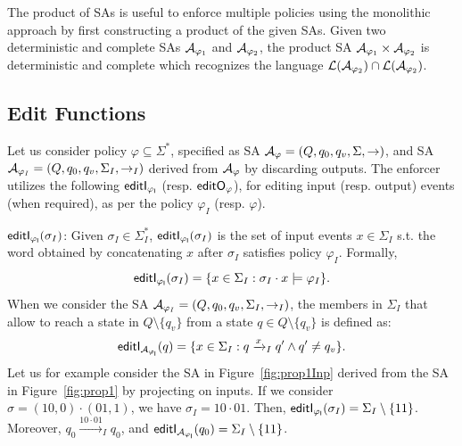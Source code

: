The product of SAs is useful to enforce multiple policies using the monolithic approach by first constructing a product of the given SAs. Given two deterministic and complete SAs ${\cal A}_{\varphi_1}$ and ${\cal A}_{\varphi_2}$, the product SA ${\cal A}_{\varphi_1} \times {\cal A}_{\varphi_2}$ is deterministic and complete which recognizes the language 
${\cal L}({\cal A}_{\varphi_2}) \cap {\cal L}({\cal A}_{\varphi_2})$.
\subsection{Edit Functions}
\label{sec:prelim:re}
Let us consider policy $\varphi\subseteq\Sigma^*$, specified as SA ${\cal A}_{\varphi}=(Q, q_0, q_v, \Sigma, \rightarrow)$, and SA ${\cal A}_{\varphi_I}=(Q, q_0, q_v, \Sigma_I, \rightarrow_I)$ derived from ${\cal A}_{\varphi}$ by discarding outputs.
The enforcer utilizes the following  $\mathsf{editI_{\varphi_I}}$ (resp. $\mathsf{editO_{\varphi}}$), for editing input (resp. output) events (when required), as per the policy $\varphi_I$ (resp. $\varphi$).
%
%
\squishlist
\item {{\boldmath$\mathsf{editI_{\varphi_I}}(\sigma_I)$}}: Given $\sigma_I\in\Sigma_I^*$, $\mathsf{editI_{\varphi_I}}(\sigma_I)$ is the set of input events $x \in \Sigma_I$ s.t. the word obtained by concatenating $x$ after $\sigma_I$ satisfies policy $\varphi_I$. Formally,
\[\mathsf{editI_{\varphi_I}}(\sigma_I) = \{ x\in \Sigma_I: \sigma_I \cdot x \models \varphi_I \}.\]
%
When we consider the SA ${\cal A}_{\varphi_I}=(Q, q_0, q_v, \Sigma_I, \rightarrow_I)$,
the members in $\Sigma_I$ that allow to reach a state in $Q\setminus \{q_v\}$ from a state $q\in Q\setminus \{q_v\}$ is defined as:
\[\mathsf{editI_{{\cal A}_{\varphi_I}}}(q) = \{x\in \Sigma_I: q \xrightarrow{x}_I q' \wedge q' \neq q_v \}. \]
%
Let us\blue{,} for example\blue{,} consider the SA in Figure~\ref{fig:prop1Inp} derived from the SA in Figure~\ref{fig:prop1} by projecting on inputs.
If we consider $\sigma= (10,0)\cdot(01,1)$, we have $\sigma_I= 10\cdot01$.
Then, $\mathsf{editI_{\varphi_I}}(\sigma_I) = \Sigma_I\setminus\{11\}$.
Moreover, $q_0 \xrightarrow{10\cdot01}_I q_0$, and $\mathsf{editI_{{\cal A}_{\varphi_I}}}(q_0) = \Sigma_I\setminus\{11\}$.

